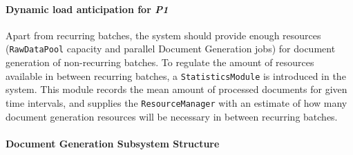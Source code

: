 \documentclass[a4paper,10pt]{article}
\begin{document}
\paragraph{Dynamic load anticipation for \emph{P1}}
Apart from recurring batches, the system should provide enough resources (\texttt{RawDataPool} capacity and parallel Document Generation jobs) for document generation of non-recurring batches. To regulate the amount of resources available in between recurring batches, a \texttt{Statistics\-Module} is introduced in the system. This module records the mean amount of processed documents for given time intervals, and supplies the \texttt{ResourceManager} with an estimate of how many document generation resources will be necessary in between recurring batches.

\paragraph{Document Generation Subsystem Structure}
\end{document}
